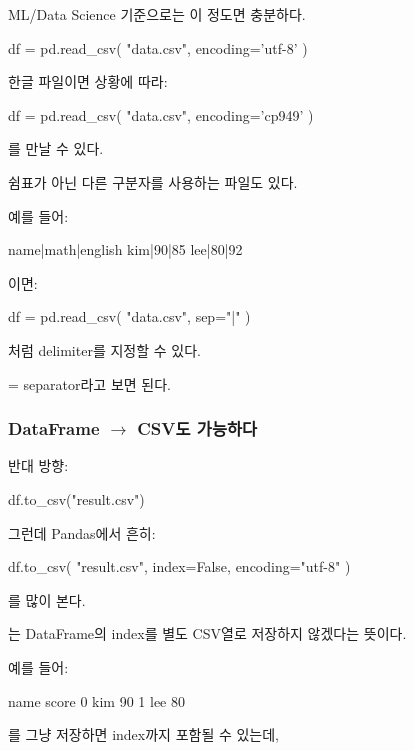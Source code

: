 ML/Data Science 기준으로는 이 정도면 충분하다.

\begin{dhkcode}
df = pd.read_csv(
    "data.csv",
    encoding='utf-8'
)
\end{dhkcode}

한글 파일이면 상황에 따라:

\begin{dhkcode}
df = pd.read_csv(
    "data.csv",
    encoding='cp949'
)
\end{dhkcode}

를 만날 수 있다.

쉼표가 아닌 다른 구분자를 사용하는 파일도 있다.

예를 들어:

\begin{dhkzsh}
name|math|english
kim|90|85
lee|80|92
\end{dhkzsh}

이면:

\begin{dhkcode}
df = pd.read_csv(
    "data.csv",
    sep="|"
)
\end{dhkcode}

처럼 delimiter를 지정할 수 있다.

 = separator라고 보면 된다.

\subsubsection{DataFrame $\rightarrow$ CSV도 가능하다}

반대 방향:

\begin{dhkcode}
df.to_csv("result.csv")
\end{dhkcode}

그런데 Pandas에서 흔히:

\begin{dhkcode}
df.to_csv(
    "result.csv",
    index=False,
    encoding="utf-8"
)
\end{dhkcode}

를 많이 본다.

는 DataFrame의 index를 별도 CSV열로 저장하지 않겠다는 뜻이다.

예를 들어:

\begin{dhksmry}
        name score
    0   kim    90
    1   lee    80
\end{dhksmry}

를 그냥 저장하면 index까지 포함될 수 있는데,

